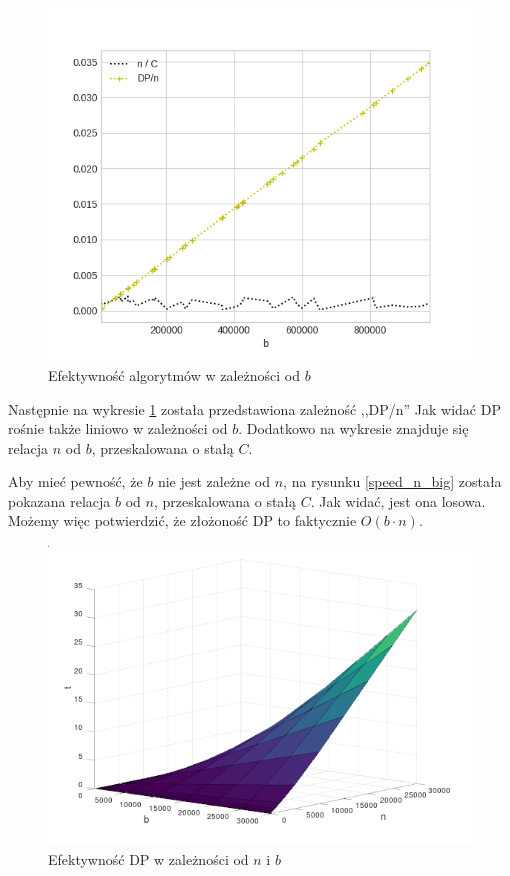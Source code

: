 \documentclass[11pt,twocolumn]{article}
\begin{document}
\begin{figure}[h]
	\includegraphics[width=\linewidth]{speed-b-big.png}
	\caption{Efektywność algorytmów w zależności od $b$ \label{speed_b_big}}
\end{figure}

Następnie na wykresie \ref{speed_b_big} została przedstawiona zależność ,,DP/n'' 
Jak widać DP rośnie także liniowo w zależności od $b$.
Dodatkowo na wykresie znajduje się relacja $n$ od $b$, przeskalowana o stałą $C$.

Aby mieć pewność, że $b$ nie jest zależne od $n$, na rysunku \ref{speed_n_big} została
pokazana relacja $b$ od $n$, przeskalowana o stałą $C$.
Jak widać, jest ona losowa.
Możemy więc potwierdzić, że złożoność DP to faktycznie $O(b \cdot n)$.

\begin{figure}[h]
	\includegraphics[width=\linewidth]{speed-bn.png}
	\caption{Efektywność DP w zależności od $n$ i $b$ \label{speed_bn}}
\end{figure}
\end{document}
